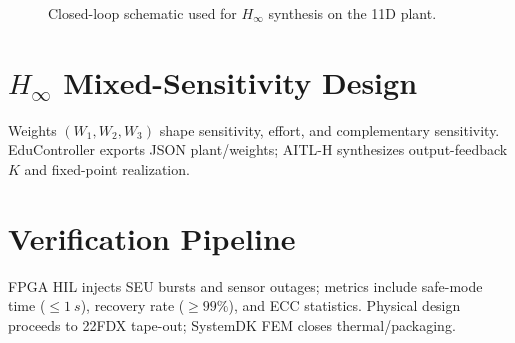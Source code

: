 \documentclass[conference]{IEEEtran}
\begin{document}
\begin{figure}[!t]
  \centering
  \caption{Closed-loop schematic used for $H_\infty$ synthesis on the 11D plant.}
  \label{fig:state_space}
\end{figure}

\section{$H_\infty$ Mixed-Sensitivity Design}
Weights $(W_1,W_2,W_3)$ shape sensitivity, effort, and complementary sensitivity. EduController exports JSON plant/weights; AITL-H synthesizes output-feedback $K$ and fixed-point realization.

\section{Verification Pipeline}
FPGA HIL injects SEU bursts and sensor outages; metrics include safe-mode time ($\leq \SI{1}{s}$), recovery rate ($\geq 99\%$), and ECC statistics. Physical design proceeds to 22FDX tape-out; SystemDK FEM closes thermal/packaging.
\end{document}
